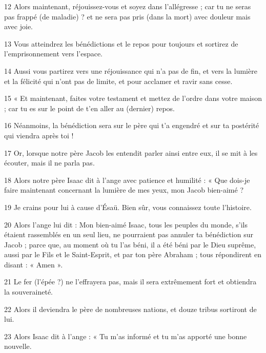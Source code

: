 \par 12 Alors maintenant, réjouissez-vous et soyez dans l'allégresse ; car tu ne seras pas frappé (de maladie) ? et ne sera pas pris (dans la mort) avec douleur mais avec joie.

\par 13 Vous atteindrez les bénédictions et le repos pour toujours et sortirez de l'emprisonnement vers l'espace.

\par 14 Aussi vous partirez vers une réjouissance qui n'a pas de fin, et vers la lumière et la félicité qui n'ont pas de limite, et pour acclamer et ravir sans cesse.

\par 15 « Et maintenant, faites votre testament et mettez de l'ordre dans votre maison ; car tu es sur le point de t'en aller au (dernier) repos.

\par 16 Néanmoins, la bénédiction sera sur le père qui t'a engendré et sur ta postérité qui viendra après toi !

\par 17 Or, lorsque notre père Jacob les entendit parler ainsi entre eux, il se mit à les écouter, mais il ne parla pas.

\par 18 Alors notre père Isaac dit à l'ange avec patience et humilité : « Que dois-je faire maintenant concernant la lumière de mes yeux, mon Jacob bien-aimé ?

\par 19 Je crains pour lui à cause d'Ésaü. Bien sûr, vous connaissez toute l’histoire.

\par 20 Alors l'ange lui dit : Mon bien-aimé Isaac, tous les peuples du monde, s'ils étaient rassemblés en un seul lieu, ne pourraient pas annuler ta bénédiction sur Jacob ; parce que, au moment où tu l'as béni, il a été béni par le Dieu suprême, aussi par le Fils et le Saint-Esprit, et par ton père Abraham ; tous répondirent en disant : « Amen ».

\par 21 Le fer (l'épée ?) ne l'effrayera pas, mais il sera extrêmement fort et obtiendra la souveraineté.

\par 22 Alors il deviendra le père de nombreuses nations, et douze tribus sortiront de lui.

\par 23 Alors Isaac dit à l'ange : « Tu m'as informé et tu m'as apporté une bonne nouvelle.

